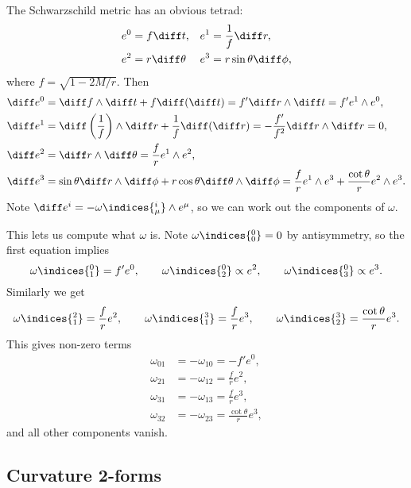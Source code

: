 \documentclass[12pt]{article}
\begin{document}
\begin{exbox}
	The Schwarzschild metric has an obvious tetrad:
	\begin{align*}
		e^0 &= f \diff t, & e^1 &= \frac 1f \diff r, \\
		e^2 &= r \diff \theta & e^3 &= r \sin \theta \diff \phi,
	\end{align*}
	where $f = \sqrt{1 - 2M/r}$. Then
	\begin{align*}
		\diff e^0 &= \diff f \wedge \diff t + f \diff(\diff t) = f' \diff r \wedge \diff t = f' e^1 \wedge e^0, \\
		\diff e^1 &= \diff \left( \frac 1f \right) \wedge \diff r + \frac 1f \diff (\diff r) = - \frac{f'}{f^2} \diff r \wedge \diff r = 0, \\
		\diff e^2 &= \diff r \wedge \diff \theta = \frac fr e^1 \wedge e^2, \\
		\diff e^3 &= \sin \theta \diff r \wedge \diff \phi + r \cos \theta \diff \theta \wedge \diff \phi = \frac fr e^1 \wedge e^3 + \frac{\cot \theta}{r} e^2 \wedge e^3.
	\end{align*}
	Note $\diff e^i = -\omega\indices{^{i}_{\mu}} \wedge e^\mu$, so we can work out the components of $\omega$.

	This lets us compute what $\omega$ is. Note $\omega\indices{^{0}_{0}} = 0$ by antisymmetry, so the first equation implies
	\[
	\omega\indices{^{0}_{1}} = f' e^0, \qquad \omega\indices{^{0}_{2}} \propto e^2, \qquad \omega\indices{^{0}_{3}} \propto e^3.
	\]
	Similarly we get
	\[
	\omega\indices{^{2}_{1}} = \frac fr e^2, \qquad \omega\indices{^{3}_{1}} = \frac fr e^3, \qquad \omega\indices{^{3}_{2}} = \frac{\cot \theta}{r} e^3.
	\]
	This gives non-zero terms
	\begin{align*}
		\omega_{01} &= - \omega_{10} = -f' e^0, \\
		\omega_{21} &= - \omega_{12} = \frac fr e^2, \\
		\omega_{31} &= - \omega_{13 } = \frac fr e^3, \\
		\omega_{32} &= - \omega_{23} = \frac{\cot \theta}{r} e^3,
	\end{align*}
	and all other components vanish.
\end{exbox}

\subsection{Curvature 2-forms}%
\label{sub:ctf}
\end{document}
